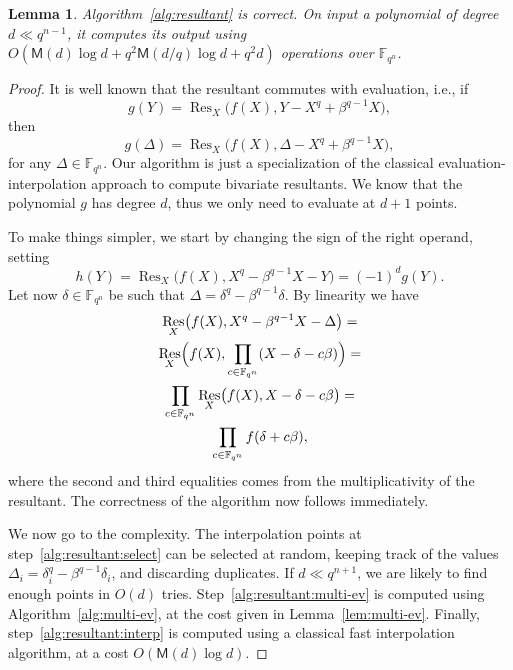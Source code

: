 \documentclass{sig-alternate}
\newcommand{\ff}[1]{\mathbb{F}_{#1}}
\newcommand{\dd}{d}
\newcommand{\qq}{q}
\newcommand{\nn}{n}
\newcommand{\qn}{{\qq^\nn}}
\newcommand{\extf}{\ff{\qn}}
\newcommand{\Mul}{\mathsf{M}}
\DeclareMathOperator{\Res}{Res}
\newcounter{algo}
\newtheorem{Lem}{Lemma}
\begin{document}
\begin{Lem}
  Algorithm~\ref{alg:resultant} is correct. On input a polynomial of
  degree $d\ll\qq^{\nn-1}$, it computes its output using $O(\Mul(\dd)
  \log\dd + \qq^2\Mul(\dd/\qq)\log\dd + \qq^2\dd)$ operations over
  $\extf$.
\end{Lem}
\begin{proof}
  It is well known that the resultant commutes with evaluation, i.e., if
  \begin{equation}
    g(Y) = \Res_X\bigl(f(X), Y-X^\qq+\beta^{\qq-1}X\bigr),
  \end{equation}
  then
  \begin{equation}
    g(\Delta) = \Res_X\bigl(f(X), \Delta-X^\qq+\beta^{\qq-1}X\bigr),
  \end{equation}
  for any $\Delta\in\extf$. Our algorithm is just a specialization of
  the classical evaluation-interpolation approach to compute bivariate
  resultants. We know that the polynomial $g$ has degree $\dd$, thus
  we only need to evaluate at $d+1$ points.

  To make things simpler, we start by changing the sign of the right
  operand, setting
  \begin{equation}
    h(Y) = \Res_X\bigl(f(X), X^\qq-\beta^{\qq-1}X-Y\bigr) = (-1)^\dd g(Y).
  \end{equation}
  Let now $\delta\in\extf$ be such that
  $\Delta=\delta^\qq-\beta^{\qq-1}\delta$. By linearity we have
  \begin{multline}
    \label{eq:lin-resultant}
    \Res_X\bigl(f(X), X^\qq-\beta^{\qq-1}X-\Delta\bigr) =\\
    \Res_X\Bigl(f(X), \prod_{c\in\extf}(X-\delta - c\beta)\Bigr) =\\
    \prod_{c\in\extf} \Res_X\bigl(f(X), X-\delta - c\beta\bigr) =\\
    \prod_{c\in\extf} f(\delta+c\beta),
  \end{multline}
  where the second and third equalities comes from the
  multiplicativity of the resultant. The correctness of the algorithm
  now follows immediately.

  We now go to the complexity. The interpolation points at
  step~\ref{alg:resultant:select} can be selected at random, keeping
  track of the values $\Delta_i=\delta_i^\qq-\beta^{\qq-1}\delta_i$,
  and discarding duplicates. If $\dd\ll\qq^{n+1}$, we are likely to
  find enough points in $O(d)$
  tries. Step~\ref{alg:resultant:multi-ev} is computed using
  Algorithm~\ref{alg:multi-ev}, at the cost given in
  Lemma~\ref{lem:multi-ev}. Finally, step~\ref{alg:resultant:interp}
  is computed using a classical fast interpolation algorithm, at a
  cost $O(\Mul(d)\log d)$.
\end{proof}
\end{document}
